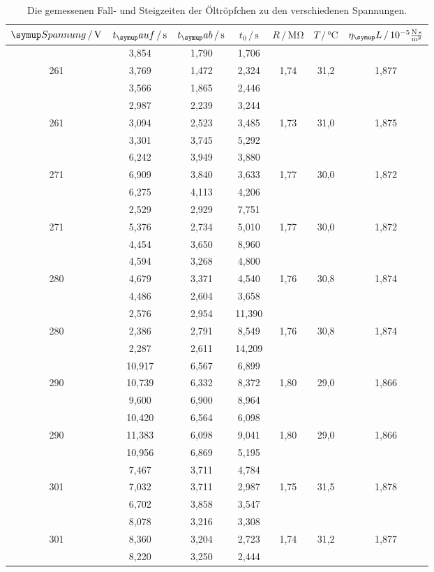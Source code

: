 \begin{table}[H]
  \small
  \centering
  \caption{Die gemessenen Fall- und Steigzeiten der Öltröpfchen zu den verschiedenen Spannungen.}
  \begin{tabular}{ccccccc}
    \toprule
    $\su{Spannung}\,/\,\si{\volt}$ & $t_\su{auf}\,/\,\si{\second}$ & $t_\su{ab}\,/\,\si{\second}$ & $t_0\,/\,\si{\second}$ & $R\,/\,\si{\mega\ohm}$ & $T\,/\,\si{\celsius}$ & $\eta_\su{L}\,/\,10^{-5}\si[per-mode=fraction]{\newton\second\per\square\meter}$\\
    \midrule
        & 3,854 & 1,790 & 1,706 & & & \\
    261 & 3,769 & 1,472 & 2,324 & 1,74 & 31,2 & 1,877 \\
        & 3,566 & 1,865 & 2,446 & & & \\
        & 2,987 & 2,239 & 3,244 & & & \\
    261 & 3,094 & 2,523 & 3,485 & 1,73 & 31,0 & 1,875 \\
        & 3,301 & 3,745 & 5,292 & & & \\
    \midrule
        & 6,242 & 3,949 & 3,880 & & & \\
    271 & 6,909 & 3,840 & 3,633 & 1,77 & 30,0 & 1,872 \\
        & 6,275 & 4,113 & 4,206 & & & \\
        & 2,529 & 2,929 & 7,751 & & & \\
    271 & 5,376 & 2,734 & 5,010 & 1,77 & 30,0 & 1,872 \\
        & 4,454 & 3,650 & 8,960 & & & \\
    \midrule
        & 4,594 & 3,268 & 4,800 & & & \\
    280 & 4,679 & 3,371 & 4,540 & 1,76 & 30,8 & 1,874 \\
        & 4,486 & 2,604 & 3,658 & & & \\
        & 2,576 & 2,954 & 11,390 & & & \\
    280 & 2,386 & 2,791 & 8,549 & 1,76 & 30,8 & 1,874 \\
        & 2,287 & 2,611 & 14,209 & & & \\
    \midrule
        & 10,917 & 6,567 & 6,899 & & & \\
    290 & 10,739 & 6,332 & 8,372 & 1,80 & 29,0 & 1,866 \\
        &  9,600 & 6,900 & 8,964 & & & \\
        & 10,420 & 6,564 & 6,098 & & & \\
    290 & 11,383 & 6,098 & 9,041 & 1,80 & 29,0 & 1,866 \\
        & 10,956 & 6,869 & 5,195 & & & \\
    \midrule
        & 7,467 & 3,711 & 4,784 & & & \\
    301 & 7,032 & 3,711 & 2,987 & 1,75 & 31,5 & 1,878 \\
        & 6,702 & 3,858 & 3,547 & & & \\
        & 8,078 & 3,216 & 3,308 & & & \\
    301 & 8,360 & 3,204 & 2,723 & 1,74 & 31,2 & 1,877 \\
        & 8,220 & 3,250 & 2,444 & & & \\
    \bottomrule
  \end{tabular}
  \label{tab:basics}
\end{table}
\newpage
